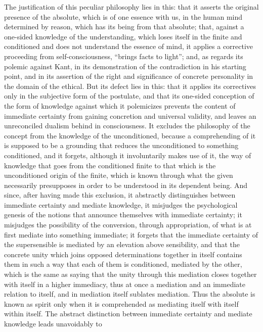 The justification of this peculiar philosophy lies in this: that it
asserts the original presence of the absolute, which is of one essence
with us, in the human mind determined by reason, which has its being
from that absolute; that, against a one-sided knowledge of the
understanding, which loses itself in the finite and conditioned and
does not understand the essence of mind, it applies a corrective
proceeding from self-consciousness, ``brings facts to light''; and, as
regards its polemic against Kant, in its demonstration of the
contradiction in his starting point, and in its assertion of the right
and significance of concrete personality in the domain of the ethical.
But its defect lies in this: that it applies its correctives only in
the subjective form of the postulate, and that its one-sided
conception of the form of knowledge against which it polemicizes
prevents the content of immediate certainty from gaining concretion and
universal validity, and leaves an unreconciled dualism behind in
consciousness. It excludes the philosophy of the concept from the
knowledge of the unconditioned, because a comprehending of it is
supposed to be a grounding that reduces the unconditioned to something
conditioned, and it forgets, although it involuntarily makes use of
it, the way of knowledge that goes from the conditioned finite to that
which is the unconditioned origin of the finite, which is known through
what the given necessarily presupposes in order to be understood in
 \setcounter{footnote}{0}
its dependent being. And since, after having made this exclusion, it
abstractly distinguishes between immediate certainty and mediate
knowledge, it misjudges the psychological genesis of the notions that
announce themselves with immediate certainty; it misjudges the
possibility of the conversion, through appropriation, of what is at
first mediate into something immediate; it forgets that the immediate
certainty of the supersensible is mediated by an elevation above
sensibility, and that the concrete unity which joins opposed
determinations together in itself contains them in such a way that
each of them is conditioned, mediated by the other, which is the same
as saying that the unity through this mediation closes together with
itself in a higher immediacy, thus at once a mediation and an immediate
relation to itself, and in mediation itself sublates mediation. Thus
the absolute is known as spirit only when it is comprehended as
mediating itself with itself within itself. The abstract distinction
between immediate certainty and mediate knowledge leads unavoidably to
